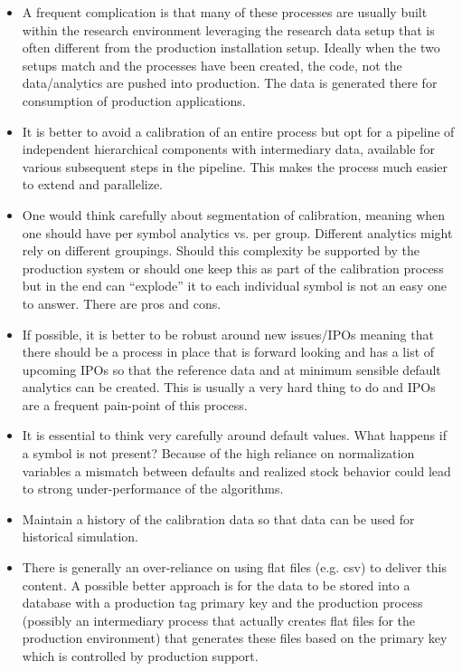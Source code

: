\begin{itemize}
\item A frequent complication is that many of these processes are usually built within the research environment leveraging the research data setup that is often different from the production installation setup. Ideally when the two setups match and the processes have been created, the code, not the data/analytics are pushed into production. The data is generated there for consumption of production applications.

\item It is better to avoid a calibration of an entire process but opt for a pipeline of independent hierarchical components with intermediary data, available for various subsequent steps in the pipeline. This makes the process much easier to extend and parallelize. 

\item One would think carefully about segmentation of calibration, meaning when one should have per symbol analytics vs. per group. Different analytics might rely on different groupings. Should this complexity be supported by the production system or should one keep this as part of the calibration process but in the end can ``explode'' it to each individual symbol is not an easy one to answer. There are pros and cons.

\item If possible, it is better to be robust around new issues/IPOs meaning that there should be a process in place that is forward looking and has a list of upcoming IPOs so that the reference data and at minimum sensible default analytics can be created. This is usually a very hard thing to do and IPOs are a frequent pain-point of this process.

\item It is essential to think very carefully around default values. What happens if a symbol is not present? Because of the high reliance on normalization variables a mismatch between defaults and realized stock behavior could lead to strong under-performance of the algorithms.

\item Maintain a history of the calibration data so that data can be used for historical simulation.

\item There is generally an over-reliance on using flat files (e.g. csv) to deliver this content. A possible better approach is for the data to be stored into a database with a production tag primary key and the production process (possibly an intermediary process that actually creates flat files for the production environment) that generates these files based on the primary key which is controlled by production support. 
\end{itemize}



